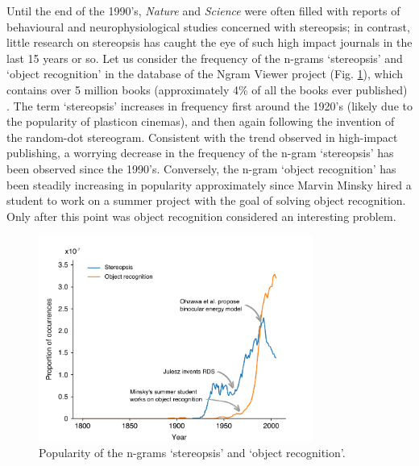 Until the end of the 1990's, \textit{Nature} and \textit{Science} were often filled with reports of behavioural and neurophysiological studies concerned with stereopsis; in contrast, little research on stereopsis has caught the eye of such high impact journals in the last 15 years or so. Let us consider the frequency of the n-grams `stereopsis' and `object recognition' in the database of the Ngram Viewer project (Fig. \ref{fig:ch6fig1}), which contains over 5 million books (approximately 4\% of all the books ever published) \cite{Michel:2011aa}. The term `stereopsis' increases in frequency first around the 1920's (likely due to the popularity of plasticon cinemas), and then again following the invention of the random-dot stereogram. Consistent with the trend observed in high-impact publishing, a worrying decrease in the frequency of the n-gram `stereopsis' has been observed since the 1990's. Conversely, the n-gram `object recognition' has been steadily increasing in popularity approximately since Marvin Minsky hired a student to work on a summer project with the goal of solving object recognition. Only after this point was object recognition considered an interesting problem.

\begin{figure}
  \centering
  \includegraphics[keepaspectratio,width=9cm]{ngrams.pdf}
  \caption[Popularity of the n-grams `stereopsis' and `object recognition'.]{Popularity of the n-grams `stereopsis' and `object recognition'.}
  \label{fig:ch6fig1}
\end{figure}

